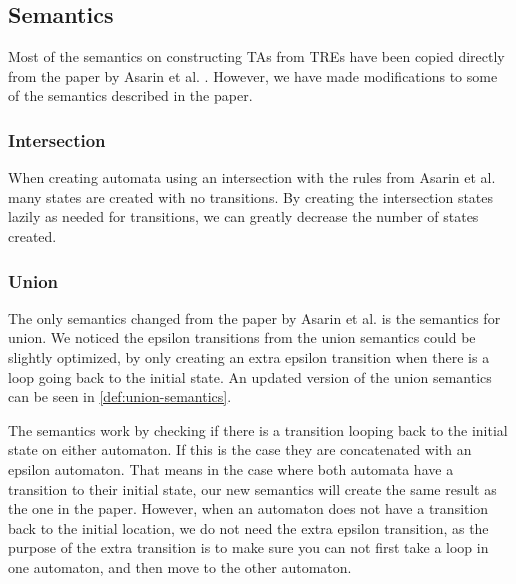\subsection{Semantics}\label{subsec:semantics}
\begin{comment}
    Where do most of our semantics come from?
    
    Intersection semantics
     - Motivation

    Describe union semantics
     - Motivation
     - New definition
     - Visual change
    
    Describe MatchAny semantics
     - Motivation
     - Definition
     - Visual
\end{comment}

Most of the semantics on constructing TAs from TREs have been copied directly from the paper by Asarin et al. \cite{Eugene2001}. However, we have made modifications to some of the semantics described in the paper.

\subsubsection{Intersection}
When creating automata using an intersection with the rules from Asarin et al.
many states are created with no transitions.
By creating the intersection states lazily as needed for transitions, we can greatly decrease the number of states created.

\subsubsection{Union}
The only semantics changed from the paper by Asarin et al. is the semantics for union.
We noticed the epsilon transitions from the union semantics could be slightly optimized, by only creating an extra epsilon transition when there is a loop going back to the initial state.
An updated version of the union semantics can be seen in \cref{def:union-semantics}.



The semantics work by checking if there is a transition looping back to the initial state on either automaton.
If this is the case they are concatenated with an epsilon automaton.
That means in the case where both automata have a transition to their initial state, our new semantics will create the same result as the one in the paper.
However, when an automaton does not have a transition back to the initial location, we do not need the extra epsilon transition, as the purpose of the extra transition is to make sure you can not first take a loop in one automaton, and then move to the other automaton.

